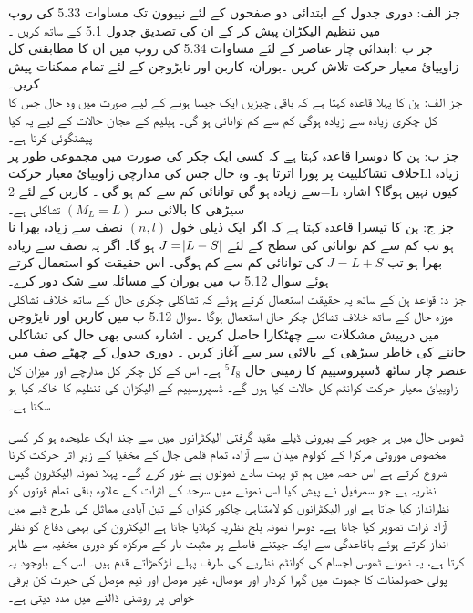   جز الف: دوری جدول کے ابتدائی  دو صفحوں  کے لئے نییوون تک مساوات 5.33 کی روپ میں تنظیم الیکڑان پیش کر کے ان کی تصدیق جدول 5.1 کے ساتھ کریں ۔ \\
  جز ب :ابتدائی  چار عناصر  کے لئے مساوات  5.34 کی روپ میں ان کا مطابقتی کل زاوییائ معیار حرکت تلاش کریں ۔بوران، کاربن اور نایڑوجن کے لئے تمام ممکنات پیش کریں۔\\
   جز الف: ہن کا پہلا قاعدہ کہتا ہے کہ باقی چیزیں ایک جیسا ہونے کے لیے صورت میں وہ حال جس کا کل چکری زیادہ سے زیادہ ہوگی کم سے کم توانائی ہو گی۔ ہیلیم کے ھجان حالات کے لیے یہ کیا پیشنگوئی کرتا ہے۔\\
    جز ب: ہن کا دوسرا قاعدہ کہتا ہے کہ کسی ایک چکر کی صورت میں مجموعی طور پر خلاف تشاکلییت پر پورا اترتا ہو۔ وہ حال جس کی مدارچی زاوییائ معیار حرکتLl زیادہ سے زیادہ ہو گی توانائی کم سے کم ہو گی ۔ کاربن کے لئے 2=L کیوں نہیں ہوگا؟ اشارہ سیڑھی کا بالائی سر
    \((M_{L}=L)\)
      تشاکلی ہے۔\\
      جز ج: ہن کا تیسرا قاعدہ کہتا ہے کہ اگر ایک ذیلی خول 
   \((n,l)\)
       نصف سے زیادہ بھرا نا ہو تب کم سے کم توانائی کی سطح کے لئے 
    \(J=\abs{L-S}\)
        ہو گا۔ اگر یہ نصف سے زیادہ بھرا ہو تب
\( J=L+S\)
 کی توانائی کم سے کم ہوگی۔ اس حقیقت کو استعمال کرتے ہوئے سوال 5.12 ب میں بوران کے مسائلہ سے شک دور کرے۔\\ 
جز د: قواعد ہن کے ساتھ یہ حقیقت استعمال کرتے ہوئے کہ تشاکلی چکری حال کے ساتھ خلاف تشاکلی موزہ حال کے ساتھ خلاف تشاکل چکر حال استعمال ہوگا ۔سوال 5.12 ب میں کاربن اور نایڑوجن میں درپیش مشکلات سے چھٹکارا حاصل کریں ۔ اشارہ کسی بھی حال کی تشاکلی جاننے کی خاطر سیڑھی کے بالائی سر سے آغاز کریں ۔
  دوری جدول کے چھٹے صف میں عنصر چار ساٹھ ڈسپروسییم کا زمینی حال
  \(^{5}I_{8}\) 
  ہے۔ اس کے کل چکر کل مدارچے اور میزان کل زاوییائ معیار حرکت کوانٹم کل حالات کیا ہوں گے۔ ڈسپروسییم کے الیکڑان  کی تنظیم کا خاکہ کیا ہو سکتا ہے۔
  
ٹھوس حال میں ہر جوہر کے بیرونی ڈیلے مقید گرفتی الیکٹرانوں میں سے چند ایک علیحدہ ہو کر کسی مخصوص موروثی مرکزا کے کولوم میدان سے آزاد، تمام قلمی جال کے مخفیا کے زیرِ اثر حرکت کرنا شروع کرتے ہے اس حصہ میں ہم تو بہت سادے نمونوں پے غور کرے گے۔ پہلا نمونہ الیکٹرون گیس نظریہ ہے جو سمرفيل نے پیش کیا اس نمونے میں سرحد کے اثرات کے علاوہ باقی تمام قوتوں کو نظرانداز کیا جاتا ہے اور الیکٹرانوں کو لامتناہی چاکور کنواں کے تین آبادی مماثل کی طرح ڈبے میں آزاد ذرات تصویر کیا جاتا ہے۔ دوسرا نمونہ بلخ نظریہ کہلایا جاتا ہے الیکٹرون کی بہمی دفاع کو نظر انداز کرتے ہوئے باقاعدگی سے ایک جیتنے فاصلے پر مثبت بار کے مرکزہ کو دوری مخفیہ سے ظاہر کرتا ہے، یہ نمونے ٹھوس اجسام کی کوانٹم نظریے کی طرف پہلے لڑکھڑاتے قدم ہیں۔ اس کے باوجود یہ پولی حصولمنات کا جموت میں گہرا کردار اور موصال، غیر موصل اور نیم موصل کی حیرت کن برقی خواص پر روشنی ڈالنے میں مدد دیتی ہے۔

